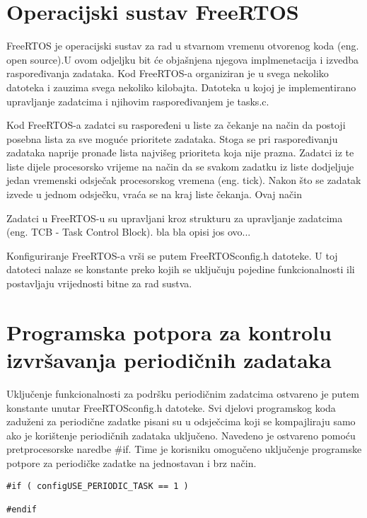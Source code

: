 \documentclass[../zavrsni.tex]{subfiles}
\begin{document}
\section{Operacijski sustav FreeRTOS}

FreeRTOS je operacijski sustav za rad u stvarnom vremenu otvorenog koda (eng. open source).U ovom odjeljku bit će objašnjena 
njegova implmenetacija i izvedba raspoređivanja zadataka. Kod FreeRTOS-a organiziran je u svega nekoliko datoteka i zauzima 
svega nekoliko kilobajta. Datoteka u kojoj je implementirano upravljanje zadatcima i njihovim raspoređivanjem je tasks.c.


Kod FreeRTOS-a zadatci su raspoređeni u liste za čekanje na način da postoji posebna lista za sve moguće prioritete zadataka.
Stoga se pri raspoređivanju zadataka naprije pronađe lista najvišeg prioriteta koja nije prazna. Zadatci iz te liste dijele 
procesorsko vrijeme na način da se svakom zadatku iz liste dodjeljuje jedan vremenski odsječak procesorskog vremena (eng. tick).
Nakon što se zadatak izvede u jednom odsječku, vraća se na kraj liste čekanja. Ovaj način 

Zadatci u FreeRTOS-u su upravljani kroz strukturu za upravljanje zadatcima (eng. TCB - Task Control Block). bla bla opisi jos ovo...

Konfiguriranje FreeRTOS-a vrši se putem FreeRTOSconfig.h datoteke. U toj datoteci nalaze se konstante preko kojih se uključuju pojedine
funkcionalnosti ili postavljaju vrijednosti bitne za rad sustva. 

\section{Programska potpora za kontrolu izvršavanja periodičnih zadataka}

Uključenje funkcionalnosti za podršku periodičnim zadatcima ostvareno je putem konstante unutar FreeRTOSconfig.h datoteke.
Svi djelovi programskog koda zaduženi za periodične zadatke pisani su u odsječcima koji se kompajliraju samo ako je korištenje
periodičnih zadataka uključeno. Navedeno je ostvareno pomoću pretprocesorske naredbe \#if. Time je korisniku omogučeno uključenje
programske potpore za periodičke zadatke na jednostavan i brz način.
\begin{lstlisting}[style=CStyle,caption={Pretprocesorska naredba za uključenje periodičnih zadataka},captionpos=b]
#if ( configUSE_PERIODIC_TASK == 1 )

#endif
\end{lstlisting}
\end{document}
